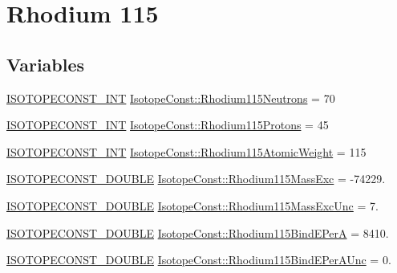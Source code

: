 \hypertarget{group___isotope_const-_rhodium-_rh115}{}\section{Rhodium 115}
\label{group___isotope_const-_rhodium-_rh115}
\subsection*{Variables}
\begin{DoxyCompactItemize}
\item 
\mbox{\hyperlink{group___isotope_const-_macros_ga5f18360b3e99483a35c32d789e62621c}{I\+S\+O\+T\+O\+P\+E\+C\+O\+N\+S\+T\+\_\+\+I\+NT}} \mbox{\hyperlink{group___isotope_const-_rhodium-_rh115_ga580a95dd13c7482d8db42a28c6208846}{Isotope\+Const\+::\+Rhodium115\+Neutrons}} = 70
\item 
\mbox{\hyperlink{group___isotope_const-_macros_ga5f18360b3e99483a35c32d789e62621c}{I\+S\+O\+T\+O\+P\+E\+C\+O\+N\+S\+T\+\_\+\+I\+NT}} \mbox{\hyperlink{group___isotope_const-_rhodium-_rh115_gaa4e1706ec8ca7fb2a1a4c312ca56130f}{Isotope\+Const\+::\+Rhodium115\+Protons}} = 45
\item 
\mbox{\hyperlink{group___isotope_const-_macros_ga5f18360b3e99483a35c32d789e62621c}{I\+S\+O\+T\+O\+P\+E\+C\+O\+N\+S\+T\+\_\+\+I\+NT}} \mbox{\hyperlink{group___isotope_const-_rhodium-_rh115_gadb524219cefbd8ed830cecf10bdb69db}{Isotope\+Const\+::\+Rhodium115\+Atomic\+Weight}} = 115
\item 
\mbox{\hyperlink{group___isotope_const-_macros_ga8f45a7272ce02c0b4c65c44636ed719a}{I\+S\+O\+T\+O\+P\+E\+C\+O\+N\+S\+T\+\_\+\+D\+O\+U\+B\+LE}} \mbox{\hyperlink{group___isotope_const-_rhodium-_rh115_ga742dd497e6997c59363d12f655ac8c6b}{Isotope\+Const\+::\+Rhodium115\+Mass\+Exc}} = -\/74229.
\item 
\mbox{\hyperlink{group___isotope_const-_macros_ga8f45a7272ce02c0b4c65c44636ed719a}{I\+S\+O\+T\+O\+P\+E\+C\+O\+N\+S\+T\+\_\+\+D\+O\+U\+B\+LE}} \mbox{\hyperlink{group___isotope_const-_rhodium-_rh115_ga2319c0f500044e31920debcb0d0c05d4}{Isotope\+Const\+::\+Rhodium115\+Mass\+Exc\+Unc}} = 7.
\item 
\mbox{\hyperlink{group___isotope_const-_macros_ga8f45a7272ce02c0b4c65c44636ed719a}{I\+S\+O\+T\+O\+P\+E\+C\+O\+N\+S\+T\+\_\+\+D\+O\+U\+B\+LE}} \mbox{\hyperlink{group___isotope_const-_rhodium-_rh115_ga088a3d993d24cbd0a66d0e75b5b5b47d}{Isotope\+Const\+::\+Rhodium115\+Bind\+E\+PerA}} = 8410.
\item 
\mbox{\hyperlink{group___isotope_const-_macros_ga8f45a7272ce02c0b4c65c44636ed719a}{I\+S\+O\+T\+O\+P\+E\+C\+O\+N\+S\+T\+\_\+\+D\+O\+U\+B\+LE}} \mbox{\hyperlink{group___isotope_const-_rhodium-_rh115_ga0a61d63623aefc7913013e1f9127d89d}{Isotope\+Const\+::\+Rhodium115\+Bind\+E\+Per\+A\+Unc}} = 0.

\end{DoxyCompactItemize}
